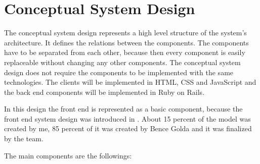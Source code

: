 \chapter{Conceptual System Design}
The conceptual system design represents a high level structure of the system's architecture. It defines the relations between the components. The components have to be separated from each other, because then every component is easily replaceable without changing any other components. The conceptual system design does not require the components to be implemented with the same technologies. The clients will be implemented in HTML, CSS and JavaScript  and the back end components will be implemented in Ruby on Rails.

In this design the front end is represented as a basic component, because the front end system design was introduced in . About 15 percent of the model was created by me, 85 percent of it was created by Bence Golda and it was finalized by the team.

The main components are the followings:

